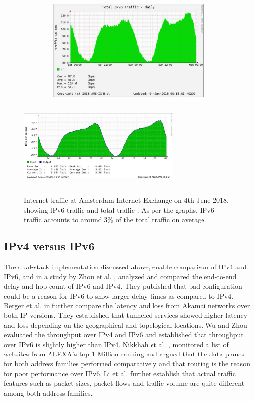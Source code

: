 \begin{figure}[!ht]
	\centering
	\begin{minipage}{0.5\linewidth}
		\centering
		\includegraphics[keepaspectratio, height=5cm, width=12cm]{figures/ipv6daily.pdf}
	\end{minipage}
	\begin{minipage}{0.5\linewidth}
		\centering
		\includegraphics[keepaspectratio, height=5cm, width=8cm]{figures/totalstats.pdf}
	\end{minipage}
	\caption[AMSIX Statistics]{Internet traffic at Amsterdam Internet Exchange on 4th June 2018, showing IPv6 traffic \cite{ipv6ams} and total traffic \cite{statsams}. 
	As per the graphs, IPv6 traffic accounts to around 3\% of the total traffic on average.}
	\label{fig:AMSIX Statistics}
\end{figure}

\subsection*{IPv4 versus IPv6}

The dual-stack implementation discussed above, enable comparison of IPv4 and IPv6, and in a study by Zhou et al. \cite{46zhou}, analyzed and compared the end-to-end delay and hop count of IPv6 
and IPv4. They published that bad configuration could be a reason for IPv6 to show larger delay times as compared to IPv4. Berger et al. in \cite{46caida} further compare the latency
and loss from Akamai networks over both IP versions. They established that tunneled services showed higher latency and loss depending on the geographical and topological locations.
Wu and Zhou \cite{46wu} evaluated the throughput over IPv4 and IPv6 and established that throughput over IPv6 is slightly higher than IPv4. Nikkhah et al. \cite{ipv6mehdi}, monitored a list of websites from ALEXA's top 1 Million ranking and argued that the data planes for both address families performed comparatively and that routing is the reason for poor performance over IPv6. Li et al. \cite{46li} further establish
that actual traffic features such as packet sizes, packet flows and traffic volume are quite different among both address families.

